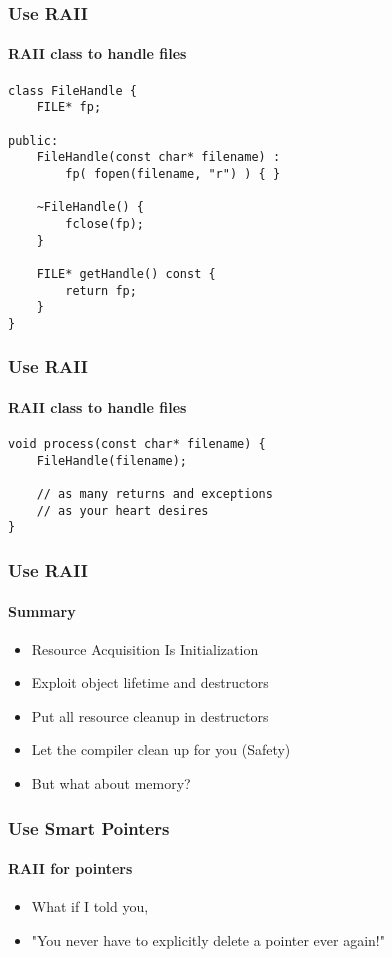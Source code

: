\begin{frame}[fragile]
    \frametitle{\declarerule Use RAII}
    \framesubtitle{RAII class to handle files}
    \begin{lstlisting}[title=Problems begone!]
class FileHandle {
    FILE* fp;

public:
    FileHandle(const char* filename) :
        fp( fopen(filename, "r") ) { }

    ~FileHandle() {
        fclose(fp);
    }

    FILE* getHandle() const {
        return fp;
    }
}
    \end{lstlisting}
\end{frame}

\begin{frame}[fragile]
    \frametitle{\declarerule Use RAII}
    \framesubtitle{RAII class to handle files}
    \begin{lstlisting}[title=Problems begone!]
void process(const char* filename) {
    FileHandle(filename);

    // as many returns and exceptions
    // as your heart desires
}
    \end{lstlisting}
\end{frame}

\begin{frame}
    \frametitle{\declarerule Use RAII}
    \framesubtitle{Summary}
    \begin{itemize}
        \item<1->Resource Acquisition Is Initialization 
        \item<1->Exploit object lifetime and destructors
        \item<1->Put all resource cleanup in destructors
        \item<1->Let the compiler clean up for you (\alert{Safety})
        \item<2->But what about memory?
    \end{itemize}
\end{frame}


\begin{frame}
    \frametitle{\declarerule Use Smart Pointers}
    \framesubtitle{RAII for pointers}
    \begin{itemize}
        \item What if I told you,
        \item "You never have to explicitly delete a pointer ever again!"
    \end{itemize}
\end{frame}




